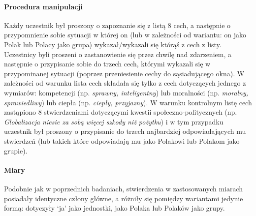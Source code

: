 \documentclass[man]{apa6}
\begin{document}
\paragraph{Procedura manipulacji}
Każdy uczestnik był proszony o zapoznanie się z listą 8 cech, a następnie o przypomnienie sobie sytuacji w której on (lub w zależności od wariantu: on jako Polak lub Polacy jako grupa) wykazał/wykazali się którąś z cech z listy. Uczestnicy byli proszeni o zastanowienie się przez chwilę nad zdarzeniem, a następnie o przypisanie sobie do trzech cech, którymi wykazali się w przypominanej sytuacji (poprzez przeniesienie cechy do sąsiadującego okna). W zależności od warunku lista cech składała się tylko z cech dotyczących jednego z wymiarów: kompetencji (np. \emph{sprawny, inteligentny}) lub moralności (np. \emph{moralny, sprawiedliwy}) lub ciepła (np. \emph{ciepły, przyjazny}). W warunku kontrolnym listę cech zastąpiono 8 stwierdzeniami dotyczącymi kwestii społeczno-politycznych (np. \emph{Globalizacja niesie za sobą więcej szkody niż pożytku}) i w tym przypadku uczestnik był proszony o przypisanie do trzech najbardziej odpowiadających mu stwierdzeń (lub takich które odpowiadają mu jako Polakowi lub Polakom jako grupie).

\paragraph{Miary}
Podobnie jak w poprzednich badaniach, stwierdzenia w zastosowanych miarach posiadały identyczne człony główne, a różniły się pomiędzy wariantami jedynie formą: dotyczyły `ja' jako jednostki, jako Polaka lub Polaków jako grupy.
\end{document}
